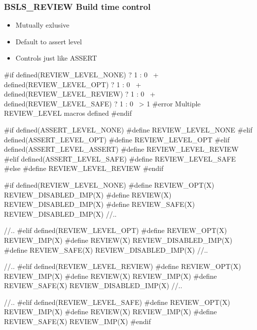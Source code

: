 \begin{frame}[fragile]
  \frametitle{BSLS_REVIEW Build time control}

  \begin{itemize}
    \item<1-> Mutually exlusive
    \item<2-> Default to assert level 
    \item<4-> Controls just like ASSERT
  \end{itemize}

\begin{overprint}
\begin{cppcodebox}
#if defined(REVIEW_LEVEL_NONE)   ? 1 : 0 \
  + defined(REVIEW_LEVEL_OPT)    ? 1 : 0 \
  + defined(REVIEW_LEVEL_REVIEW) ? 1 : 0 \
  + defined(REVIEW_LEVEL_SAFE)   ? 1 : 0 \
  > 1
#error Multiple REVIEW_LEVEL macros defined
#endif
\end{cppcodebox}

\onslide<2-3>
\begin{cppcodebox}
#if defined(ASSERT_LEVEL_NONE)
#define REVIEW_LEVEL_NONE
#elif defined(ASSERT_LEVEL_OPT)
#define REVIEW_LEVEL_OPT
#elif defined(ASSERT_LEVEL_ASSERT)
#define REVIEW_LEVEL_REVIEW
#elif defined(ASSERT_LEVEL_SAFE)
#define REVIEW_LEVEL_SAFE
#else
#define REVIEW_LEVEL_REVIEW
#endif
\end{cppcodebox}

\begin{cppcodebox}
#if defined(REVIEW_LEVEL_NONE)
#define REVIEW_OPT(X)  REVIEW_DISABLED_IMP(X)
#define REVIEW(X)      REVIEW_DISABLED_IMP(X)
#define REVIEW_SAFE(X) REVIEW_DISABLED_IMP(X)
//..  
\end{cppcodebox}

\onslide<5>
\begin{cppcodebox}
//..
#elif defined(REVIEW_LEVEL_OPT)
#define REVIEW_OPT(X)  REVIEW_IMP(X)
#define REVIEW(X)      REVIEW_DISABLED_IMP(X)
#define REVIEW_SAFE(X) REVIEW_DISABLED_IMP(X)
//..  
\end{cppcodebox}

\onslide<6>
\begin{cppcodebox}
//..
#elif defined(REVIEW_LEVEL_REVIEW)
#define REVIEW_OPT(X)  REVIEW_IMP(X)
#define REVIEW(X)      REVIEW_IMP(X)
#define REVIEW_SAFE(X) REVIEW_DISABLED_IMP(X)
//..  
\end{cppcodebox}

\onslide<7>
\begin{cppcodebox}
//..
#elif defined(REVIEW_LEVEL_SAFE)
#define REVIEW_OPT(X)  REVIEW_IMP(X)
#define REVIEW(X)      REVIEW_IMP(X)
#define REVIEW_SAFE(X) REVIEW_IMP(X)
#endif
\end{cppcodebox}


\end{overprint}
\end{frame}
